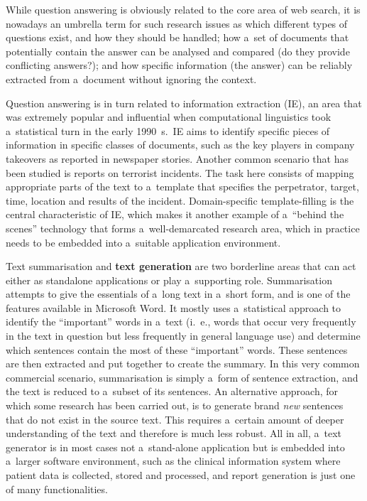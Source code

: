 \begin{multicols}{2}
While question answering is obviously related to the core area of web
search, it is nowadays an umbrella term for such research issues as
which different types of questions exist, and how they should be
handled; how a~set of documents that potentially contain the answer
can be analysed and compared (do they provide conflicting answers?);
and how specific information (the answer) can be reliably extracted
from a~document without ignoring the context. 

Question answering is in turn related to information extraction (IE),
an area that was extremely popular and influential when computational
linguistics took a~statistical turn in the early 1990~s.~IE aims to
identify specific pieces of information in specific classes of
documents, such as the key players in company takeovers as reported in
newspaper stories. Another common scenario that has been studied is
reports on terrorist incidents. The task here consists of mapping
appropriate parts of the text to a~template that specifies the
perpetrator, target, time, location and results of the incident.
Domain-specific template-filling is the central characteristic of IE,
which makes it another example of a~“behind the scenes” technology
that forms a~well-demarcated research area, which in practice needs to
be embedded into a~suitable application environment. 


Text summarisation and \textbf{text generation} are two borderline
areas that can act either as standalone applications or play
a~supporting role. Summarisation attempts to give the essentials of
a~long text in a~short form, and is one of the features available in
Microsoft Word. It mostly uses a~statistical approach to identify the
“important” words in a~text (i.\, e., words that occur very
frequently in the text in question but less frequently in general
language use) and determine which sentences contain the most of these
“important” words. These sentences are then extracted and put
together to create the summary. In this very common commercial
scenario, summarisation is simply a~form of sentence extraction, and
the text is reduced to a~subset of its sentences. An alternative
approach, for which some research has been carried out, is to generate
brand \emph{new} sentences that do not exist in the source text. This
requires a~certain amount of deeper understanding of the text and
therefore is much less robust. All in all, a~text generator is in most
cases not a~stand-alone application but is embedded into a~larger
software environment, such as the clinical information system where
patient data is collected, stored and processed, and report generation
is just one of many functionalities. 


\end{multicols}
